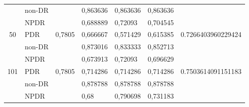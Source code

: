 \begin{table}[hbtp]
\begin{center}
\begin{tabular}{|c|l|c|l|l|l|c|}
                              & non-DR                                             &                          & 0,863636                                          & 0,863636                                         & 0,863636                                        &                                      \\ \cline{2-2} \cline{4-6}
                              & NPDR                                               &                          & 0,688889                                          & 0,72093                                          & 0,704545                                        &                                      \\ \cline{2-2} \cline{4-6}
        \multirow{-3}{*}{50}  & PDR                                                & \multirow{-3}{*}{0,7805} & 0,666667                                          & 0,571429                                         & 0,615385                                        & \multirow{-3}{*}{0.7266403960229424} \\ \hline
                              & non-DR                                             &                          & 0,873016                                          & 0,833333                                         & 0,852713                                        &                                      \\ \cline{2-2} \cline{4-6}
                              & NPDR                                               &                          & 0,673913                                          & 0,72093                                          & 0,696629                                        &                                      \\ \cline{2-2} \cline{4-6}
        \multirow{-3}{*}{101} & PDR                                                & \multirow{-3}{*}{0,7805} & 0,714286                                          & 0,714286                                         & 0,714286                                        & \multirow{-3}{*}{0.7503614091151183} \\ \hline
                              & non-DR                                             &                          & 0,878788                                          & 0,878788                                         & 0,878788                                        &                                      \\ \cline{2-2} \cline{4-6}
                              & NPDR                                               &                          & 0,68                                              & 0,790698                                         & 0,731183                                        &                                      \\ \cline{2-2} \cline{4-6}

\end{tabular}
\end{center}
\end{table}
